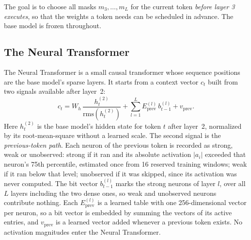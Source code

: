 \documentclass[10pt,twocolumn,letterpaper]{article}
\begin{document}
The goal is to choose all masks $m_3,\dots,m_L$ for the current token \emph{before layer 3 executes}, so that the weights a token needs can be scheduled in advance. The base model is frozen throughout.

\subsection{The Neural Transformer}

The Neural Transformer is a small causal transformer whose sequence positions are the base model's sparse layers. It starts from a context vector $c_t$ built from two signals available after layer~2:
\begin{equation}
c_t = W_h\,\frac{h^{(2)}_t}{\mathrm{rms}(h^{(2)}_t)} + \sum_{l=1}^{L} E^{(l)}_{\mathrm{prev}}\, b^{(l)}_{t-1} + v_{\mathrm{prev}}.
\end{equation}
Here $h^{(2)}_t$ is the base model's hidden state for token $t$ after layer~2, normalized by its root-mean-square without a learned scale. The second signal is the \emph{previous-token path}. Each neuron of the previous token is recorded as strong, weak or unobserved: strong if it ran and its absolute activation $|a_i|$ exceeded that neuron's 75th percentile, estimated once from 16 reserved training windows; weak if it ran below that level; unobserved if it was skipped, since its activation was never computed. The bit vector $b^{(l)}_{t-1}$ marks the strong neurons of layer $l$, over all $L$ layers including the two dense ones, so weak and unobserved neurons contribute nothing. Each $E^{(l)}_{\mathrm{prev}}$ is a learned table with one 256-dimensional vector per neuron, so a bit vector is embedded by summing the vectors of its active entries, and $v_{\mathrm{prev}}$ is a learned vector added whenever a previous token exists. No activation magnitudes enter the Neural Transformer.
\end{document}
